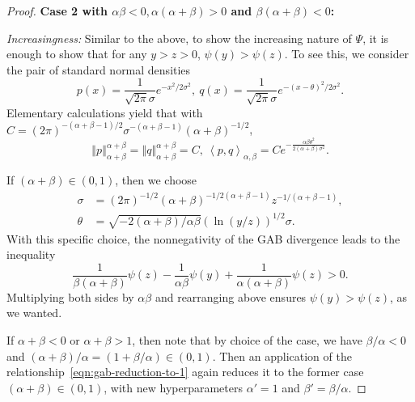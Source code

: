\documentclass[11pt]{article}
\theoremstyle{plain}
\theoremstyle{remark}
\newcommand{\norm}[1]{\left\Vert #1 \right\Vert}
\newcommand{\inner}[1]{\left\langle #1\right\rangle}
\begin{document}
\begin{proof}
    \noindent\textbf{Case 2 with $\alpha\beta < 0, \alpha(\alpha+\beta) > 0$ and $\beta(\alpha+\beta) < 0$:}

    \noindent\emph{Increasingness:} Similar to the above, to show the increasing nature of $\Psi$, it is enough to show that for any $y > z > 0$, $\psi(y) > \psi(z)$. To see this, we consider the pair of standard normal densities
    \begin{equation*}
        p(x) = \frac{1}{\sqrt{2\pi}\sigma}e^{-x^2/2\sigma^2}, \
        q(x) = \frac{1}{\sqrt{2\pi}\sigma}e^{-(x-\theta)^2/2\sigma^2}.
    \end{equation*}
    \noindent Elementary calculations yield that with $C = (2\pi)^{-(\alpha+\beta - 1)/2}\sigma^{-(\alpha+\beta - 1)}(\alpha+\beta)^{-1/2}$,
    \begin{equation*}
        \norm{p}_{\alpha+\beta}^{\alpha+\beta}
        = \norm{q}_{\alpha+\beta}^{\alpha+\beta} = C, \
        \inner{p,q}_{\alpha,\beta} = Ce^{-\frac{\alpha\beta\theta^2}{2(\alpha+\beta)\sigma^2} }.
    \end{equation*}

    If $(\alpha + \beta) \in (0, 1)$, then we choose
    \begin{align*}
        \sigma & = (2\pi)^{-1/2}(\alpha+\beta)^{-1/2(\alpha+\beta - 1)}z^{-1/(\alpha+\beta-1)}, \\
        \theta & = \sqrt{-2(\alpha+\beta)/\alpha\beta} (\ln(y/z))^{1/2}\sigma.
    \end{align*}
    \noindent With this specific choice, the nonnegativity of the GAB divergence leads to the inequality
    \begin{equation*}
        \dfrac{1}{\beta(\alpha+\beta)}\psi(z) - \dfrac{1}{\alpha\beta}\psi(y) + \dfrac{1}{\alpha(\alpha+\beta)}\psi(z) > 0.
    \end{equation*}
    \noindent Multiplying both sides by $\alpha\beta$ and rearranging above ensures $\psi(y) > \psi(z)$, as we wanted.

    If $\alpha + \beta < 0$ or $\alpha + \beta > 1$, then note that by choice of the case, we have $\beta/\alpha < 0$ and $(\alpha+\beta)/\alpha = (1 + \beta/\alpha) \in (0, 1)$. Then an application of the relationship~\eqref{eqn:gab-reduction-to-1} again reduces it to the former case $(\alpha+\beta) \in (0, 1)$, with new hyperparameters $\alpha' = 1$ and $\beta' = \beta/\alpha$.


\end{proof}
\end{document}

